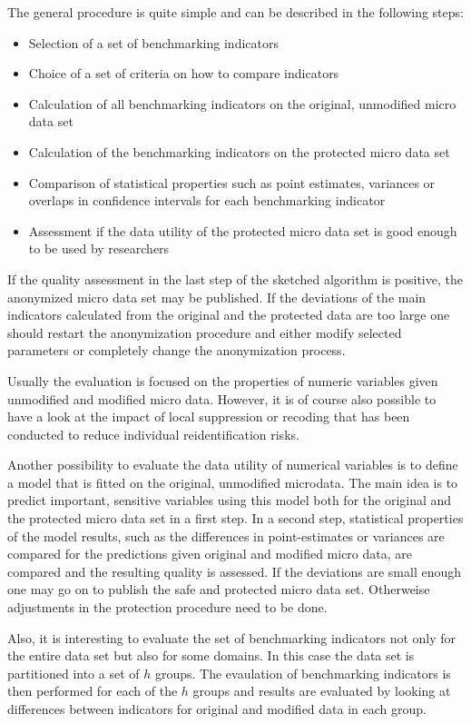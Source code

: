 \documentclass[12pt]{article}
\begin{document}
The general procedure is quite simple and can be described in the following
steps:
\begin{itemize}
  \item Selection of a set of benchmarking indicators
  \item Choice of a set of criteria on how to compare indicators
  \item Calculation of all benchmarking indicators on the original, unmodified
  micro data set
  \item Calculation of the benchmarking indicators on the protected
  micro data set
  \item Comparison of statistical properties such as point estimates, variances
  or overlaps in confidence intervals for each benchmarking indicator 
  \item Assessment if the data utility of the protected micro data set is good
  enough to be used by researchers
\end{itemize}

If the quality assessment in the last step of the sketched algorithm is
positive, the anonymized micro data set may be published. If the deviations of
the main indicators calculated from the original and the protected data are too
large one should restart the anonymization procedure and either modify selected
parameters or completely change the anonymization process.

Usually the evaluation is focused on the properties of numeric
variables given unmodified and modified micro data. However, it is of course
also possible to have a look at the impact of local suppression or recoding that
has been conducted to reduce individual reidentification risks. 

Another possibility to evaluate the data utility of numerical variables is to
define a model that is fitted on the original, unmodified microdata. The main
idea is to predict important, sensitive variables using this model both for the
original and the protected micro data set in a first step. In a second step,
statistical properties of the model results, such as the differences in
point-estimates or variances are compared for the predictions given original and
modified micro data, are compared and the resulting quality is assessed. If the
deviations are small enough one may go on to publish the safe and protected
micro data set. Otherweise adjustments in the protection procedure need to be
done.

Also, it is interesting to evaluate the set of benchmarking indicators not only
for the entire data set but also for some domains. In this case the data set is
partitioned into a set of $h$ groups. The evaulation of benchmarking indicators
is then performed for each of the $h$ groups and results are evaluated by
looking at differences between indicators for original and modified data in each
group.
\end{document}
